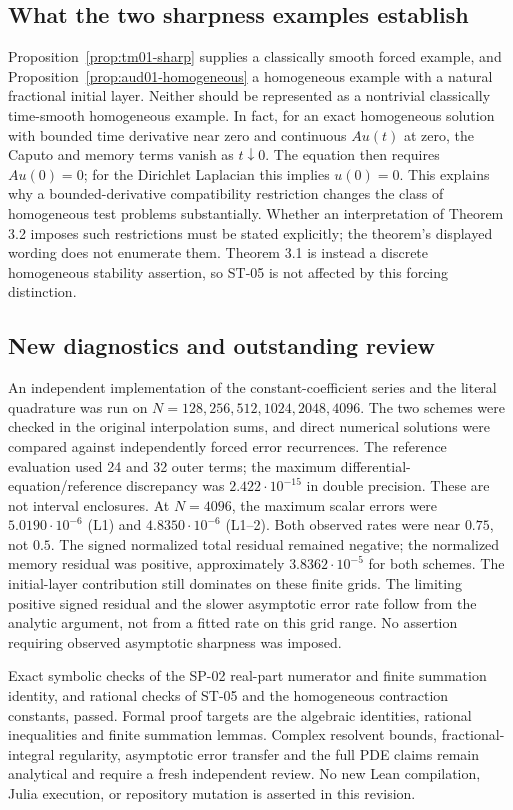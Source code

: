 \subsection{What the two sharpness examples establish}
Proposition~\ref{prop:tm01-sharp} supplies a classically smooth forced example, and Proposition~\ref{prop:aud01-homogeneous} a homogeneous example with a natural fractional initial layer. Neither should be represented as a nontrivial classically time-smooth homogeneous example. In fact, for an exact homogeneous solution with bounded time derivative near zero and continuous $Au(t)$ at zero, the Caputo and memory terms vanish as $t\downarrow0$. The equation then requires $Au(0)=0$; for the Dirichlet Laplacian this implies $u(0)=0$. This explains why a bounded-derivative compatibility restriction changes the class of homogeneous test problems substantially. Whether an interpretation of Theorem 3.2 imposes such restrictions must be stated explicitly; the theorem's displayed wording does not enumerate them. Theorem 3.1 is instead a discrete homogeneous stability assertion, so ST-05 is not affected by this forcing distinction.

\subsection{New diagnostics and outstanding review}
An independent implementation of the constant-coefficient series and the literal quadrature was run on $N=128,256,512,1024,2048,4096$. The two schemes were checked in the original interpolation sums, and direct numerical solutions were compared against independently forced error recurrences. The reference evaluation used 24 and 32 outer terms; the maximum differential-equation/reference discrepancy was $2.422\cdot10^{-15}$ in double precision. These are not interval enclosures. At $N=4096$, the maximum scalar errors were $5.0190\cdot10^{-6}$ (L1) and $4.8350\cdot10^{-6}$ (L1--2). Both observed rates were near $0.75$, not $0.5$. The signed normalized total residual remained negative; the normalized memory residual was positive, approximately $3.8362\cdot10^{-5}$ for both schemes. The initial-layer contribution still dominates on these finite grids. The limiting positive signed residual and the slower asymptotic error rate follow from the analytic argument, not from a fitted rate on this grid range. No assertion requiring observed asymptotic sharpness was imposed.

Exact symbolic checks of the SP-02 real-part numerator and finite summation identity, and rational checks of ST-05 and the homogeneous contraction constants, passed. Formal proof targets are the algebraic identities, rational inequalities and finite summation lemmas. Complex resolvent bounds, fractional-integral regularity, asymptotic error transfer and the full PDE claims remain analytical and require a fresh independent review. No new Lean compilation, Julia execution, or repository mutation is asserted in this revision.
